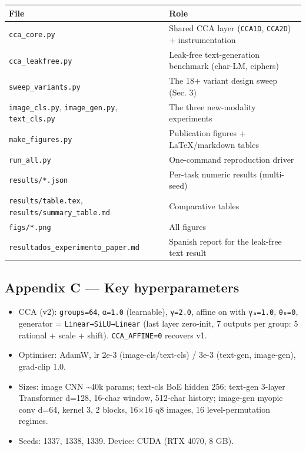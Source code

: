 \documentclass[
  11pt,
]{article}
\newcounter{none} %
\providecommand{\tightlist}{%
  \setlength{\itemsep}{0pt}\setlength{\parskip}{0pt}}
\begin{document}
{\def\LTcaptype{none} %
\begin{longtable}[]{@{}
  >{\raggedright\arraybackslash}p{}
  >{\raggedright\arraybackslash}p{}@{}}
\toprule\noalign{}
\begin{minipage}[b]{\linewidth}\raggedright
File
\end{minipage} & \begin{minipage}[b]{\linewidth}\raggedright
Role
\end{minipage} \\
\midrule\noalign{}
\endhead
\bottomrule\noalign{}
\endlastfoot
\texttt{cca\_core.py} & Shared CCA layer (\texttt{CCA1D},
\texttt{CCA2D}) + instrumentation \\
\texttt{cca\_leakfree.py} & Leak-free text-generation benchmark
(char-LM, ciphers) \\
\texttt{sweep\_variants.py} & The 18+ variant design sweep (Sec. 3) \\
\texttt{image\_cls.py}, \texttt{image\_gen.py}, \texttt{text\_cls.py} &
The three new-modality experiments \\
\texttt{make\_figures.py} & Publication figures + LaTeX/markdown
tables \\
\texttt{run\_all.py} & One-command reproduction driver \\
\texttt{results/*.json} & Per-task numeric results (multi-seed) \\
\texttt{results/table.tex}, \texttt{results/summary\_table.md} &
Comparative tables \\
\texttt{figs/*.png} & All figures \\
\texttt{resultados\_experimento\_paper.md} & Spanish report for the
leak-free text result \\
\end{longtable}
}

\subsection{Appendix C --- Key
hyperparameters}\label{appendix-c-key-hyperparameters}

\begin{itemize}
\tightlist
\item
  CCA (v2): \texttt{groups=64}, \texttt{α=1.0} (learnable),
  \texttt{γ=2.0}, affine on with \texttt{γₐ=1.0}, \texttt{θ₀=0},
  generator = \texttt{Linear→SiLU→Linear} (last layer zero-init, 7
  outputs per group: 5 rational + scale + shift). \texttt{CCA\_AFFINE=0}
  recovers v1.
\item
  Optimiser: AdamW, lr 2e-3 (image-cls/text-cls) / 3e-3 (text-gen,
  image-gen), grad-clip 1.0.
\item
  Sizes: image CNN \textasciitilde40k params; text-cls BoE hidden 256;
  text-gen 3-layer Transformer d=128, 16-char window, 512-char history;
  image-gen myopic conv d=64, kernel 3, 2 blocks, 16×16 q8 images, 16
  level-permutation regimes.
\item
  Seeds: 1337, 1338, 1339. Device: CUDA (RTX 4070, 8 GB).
\end{itemize}
\end{document}
